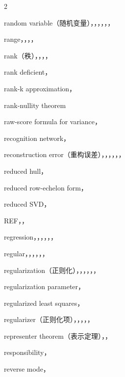 \begin{multicols}{2}
\medskip{}\par\smallskip
\noindent random variable（随机变量），，，，，，\par
\noindent range，，，，\par
\noindent rank（秩），，，，\par
\noindent rank deficient，\par
\noindent rank-k approximation，\par
\noindent rank-nullity theorem\par
\noindent raw-score formula for variance，\par
\noindent recognition network，\par
\noindent reconstruction error（重构误差），，，，，，\par
\noindent reduced hull，\par
\noindent reduced row-echelon form，\par
\noindent reduced SVD，\par
\noindent REF，，\par
\noindent regression，，，，，，\par
\noindent regular，，，，，，\par
\noindent regularization（正则化），，，，，，\par
\noindent regularization parameter，\par
\noindent regularized least squares，\par
\noindent regularizer（正则化项），，，，，\par
\noindent representer theorem（表示定理），，\par
\noindent responsibility，\par
\noindent reverse mode，\par

\end{multicols}
